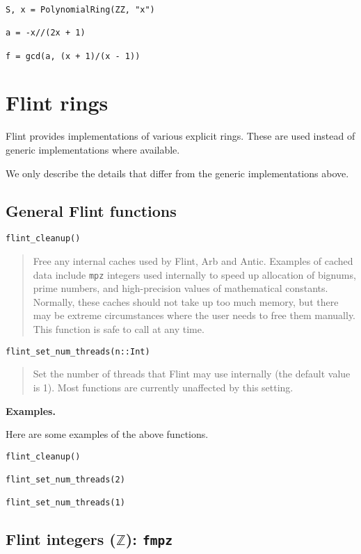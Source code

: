 \documentclass[a4paper,10pt]{article}
\newcommand{\Z}{\mathbb{Z}}
\newcommand{\code}{\lstinline}
\newcommand{\desc}[1]{\vspace{-3mm}\begin{quote}#1\end{quote}}
\begin{document}
\begin{lstlisting}
S, x = PolynomialRing(ZZ, "x")

a = -x//(2x + 1)

f = gcd(a, (x + 1)/(x - 1))
\end{lstlisting}

\section{Flint rings}

Flint provides implementations of various explicit rings. These are used instead of generic
implementations where available.

We only describe the details that differ from the generic implementations above.

\subsection{General Flint functions}

\begin{lstlisting}
flint_cleanup()
\end{lstlisting}

\desc{Free any internal caches used by Flint, Arb and Antic.
Examples of cached data include \code{mpz} integers used internally
to speed up allocation of bignums,
prime numbers, and high-precision values of mathematical constants.
Normally, these caches should not take up too much memory, but there may
be extreme circumstances where the user needs to free them manually.
This function is safe to call at any time.}

\begin{lstlisting}
flint_set_num_threads(n::Int)
\end{lstlisting}

\desc{Set the number of threads that Flint may use internally (the default
value is 1). Most functions are currently unaffected by this setting.}

\textbf{Examples.}

Here are some examples of the above functions.

\begin{lstlisting}
flint_cleanup()

flint_set_num_threads(2)

flint_set_num_threads(1)
\end{lstlisting}

\subsection{Flint integers ($\Z$): \code{fmpz}}
\end{document}
